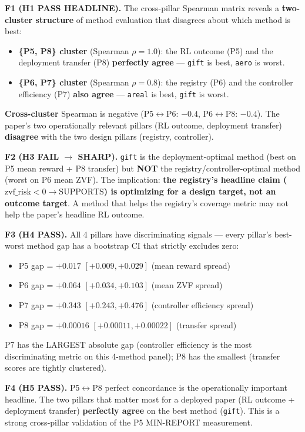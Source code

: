 \textbf{F1 (H1 PASS HEADLINE).}
The cross-pillar Spearman matrix reveals a \textbf{two-cluster structure}
of method evaluation that disagrees about which method is best:
\begin{itemize}
\item \textbf{\{P5, P8\} cluster} (Spearman $\rho = 1.0$): the RL outcome
  (P5) and the deployment transfer (P8) \textbf{perfectly agree} ---
  \texttt{gift} is best, \texttt{aero} is worst.
\item \textbf{\{P6, P7\} cluster} (Spearman $\rho = 0.8$): the registry
  (P6) and the controller efficiency (P7) \textbf{also agree} ---
  \texttt{areal} is best, \texttt{gift} is worst.
\end{itemize}
\textbf{Cross-cluster} Spearman is negative (P5$\leftrightarrow$P6:
$-0.4$, P6$\leftrightarrow$P8: $-0.4$). The paper's two operationally
relevant pillars (RL outcome, deployment transfer) \textbf{disagree}
with the two design pillars (registry, controller).

\textbf{F2 (H3 FAIL $\rightarrow$ SHARP).}
\texttt{gift} is the deployment-optimal method (best on P5 mean reward
+ P8 transfer) but \textbf{NOT} the registry/controller-optimal method
(worst on P6 mean ZVF). The implication: \textbf{the registry's headline
claim ($\mathrm{zvf\_risk}{<}0 \rightarrow \mathrm{SUPPORTS}$) is
optimizing for a design target, not an outcome target}. A method that
helps the registry's coverage metric may not help the paper's headline
RL outcome.

\textbf{F3 (H4 PASS).}
All 4 pillars have discriminating signals --- every pillar's best-worst
method gap has a bootstrap CI that strictly excludes zero:
\begin{itemize}
\item P5 gap = $+0.017$ $[+0.009, +0.029]$ (mean reward spread)
\item P6 gap = $+0.064$ $[+0.034, +0.103]$ (mean ZVF spread)
\item P7 gap = $+0.343$ $[+0.243, +0.476]$ (controller efficiency spread)
\item P8 gap = $+0.00016$ $[+0.00011, +0.00022]$ (transfer spread)
\end{itemize}
P7 has the LARGEST absolute gap (controller efficiency is the most
discriminating metric on this 4-method panel); P8 has the smallest
(transfer scores are tightly clustered).

\textbf{F4 (H5 PASS).}
P5$\leftrightarrow$P8 perfect concordance is the operationally important
headline. The two pillars that matter most for a deployed paper (RL
outcome + deployment transfer) \textbf{perfectly agree} on the best
method (\texttt{gift}). This is a strong cross-pillar validation of
the P5 MIN-REPORT measurement.

